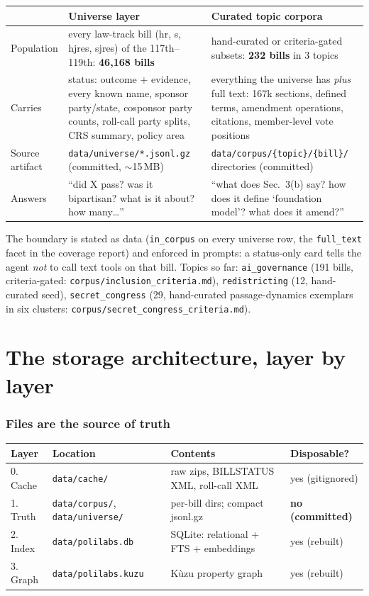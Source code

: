 \documentclass[11pt]{article}
\newcommand{\file}[1]{\texttt{#1}}
\newcommand{\code}[1]{\texttt{#1}}
\begin{document}
\begin{center}
\begin{tabular}{@{}p{3.2cm}p{5.4cm}p{5.4cm}@{}}
\toprule
 & \textbf{Universe layer} & \textbf{Curated topic corpora} \\
\midrule
Population & every law-track bill (hr, s, hjres, sjres) of the 117th--119th:
\textbf{46{,}168 bills} & hand-curated or criteria-gated subsets:
\textbf{232 bills} in 3 topics \\
Carries & status: outcome + evidence, every known name, sponsor party/state,
cosponsor party counts, roll-call party splits, CRS summary, policy area &
everything the universe has \emph{plus} full text: 167k sections, defined
terms, amendment operations, citations, member-level vote positions \\
Source artifact & \file{data/universe/*.jsonl.gz} (committed, $\sim$15\,MB) &
\file{data/corpus/\{topic\}/\{bill\}/} directories (committed) \\
Answers & ``did X pass? was it bipartisan? what is it about? how many\ldots'' &
``what does Sec.~3(b) say? how does it define `foundation model'? what does
it amend?'' \\
\bottomrule
\end{tabular}
\end{center}

The boundary is stated as data (\code{in\_corpus} on every universe row, the
\code{full\_text} facet in the coverage report) and enforced in prompts: a
status-only card tells the agent \emph{not} to call text tools on that bill.
Topics so far: \code{ai\_governance} (191 bills, criteria-gated:
\file{corpus/inclusion\_criteria.md}), \code{redistricting} (12, hand-curated
seed), \code{secret\_congress} (29, hand-curated passage-dynamics exemplars in
six clusters: \file{corpus/secret\_congress\_criteria.md}).

\part{The storage architecture, layer by layer}

\section{Files are the source of truth}
\label{sec:layers}

\begin{center}
\begin{tabular}{@{}llll@{}}
\toprule
Layer & Location & Contents & Disposable? \\
\midrule
0. Cache & \file{data/cache/} & raw zips, BILLSTATUS XML, roll-call XML & yes (gitignored) \\
1. Truth & \file{data/corpus/}, \file{data/universe/} & per-bill dirs; compact jsonl.gz & \textbf{no (committed)} \\
2. Index & \file{data/polilabs.db} & SQLite: relational + FTS + embeddings & yes (rebuilt) \\
3. Graph & \file{data/polilabs.kuzu} & K\`uzu property graph & yes (rebuilt) \\
\bottomrule
\end{tabular}
\end{center}
\end{document}
